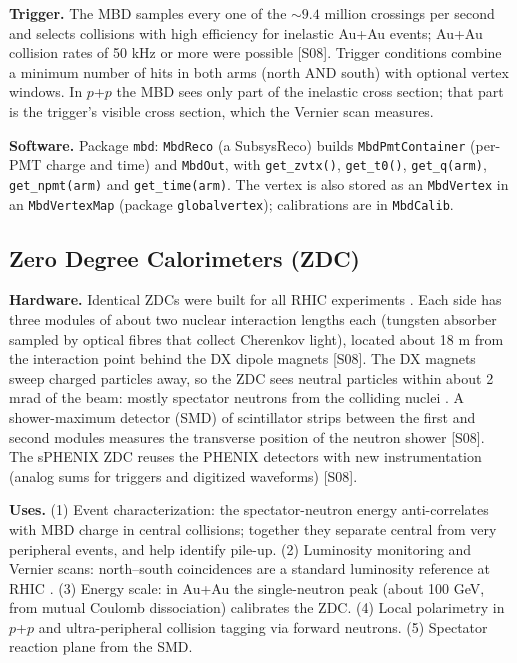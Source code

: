 \documentclass[11pt,letterpaper]{article}
\begin{document}
\textbf{Trigger.} The MBD samples every one of the $\sim9.4$ million crossings per second and selects collisions with high
efficiency for inelastic Au+Au events; Au+Au collision rates of 50 kHz or more were possible [S08]. Trigger conditions
combine a minimum number of hits in both arms (north AND south) with optional vertex windows. In $p$+$p$ the MBD sees only
part of the inelastic cross section; that part is the trigger's visible cross section, which the Vernier scan measures.

\textbf{Software.} Package \texttt{mbd}: \texttt{MbdReco} (a SubsysReco) builds \texttt{MbdPmtContainer} (per-PMT charge and
time) and \texttt{MbdOut}, with \texttt{get\_zvtx()}, \texttt{get\_t0()}, \texttt{get\_q(arm)}, \texttt{get\_npmt(arm)} and
\texttt{get\_time(arm)}. The vertex is also stored as an \texttt{MbdVertex} in an \texttt{MbdVertexMap} (package
\texttt{globalvertex}); calibrations are in \texttt{MbdCalib}.

\subsection{Zero Degree Calorimeters (ZDC)}
\textbf{Hardware.} Identical ZDCs were built for all RHIC experiments \cite{zdc}. Each side has three modules of about two
nuclear interaction lengths each (tungsten absorber sampled by optical fibres that collect Cherenkov light), located about 18 m
from the interaction point behind the DX dipole magnets [S08]. The DX magnets sweep charged particles away, so the ZDC sees
neutral particles within about 2 mrad of the beam: mostly spectator neutrons from the colliding nuclei \cite{zdc}.
A shower-maximum detector (SMD) of scintillator strips between the first and second modules measures the transverse position
of the neutron shower [S08]. The sPHENIX ZDC reuses the PHENIX detectors with new instrumentation (analog sums for triggers and
digitized waveforms) [S08].

\textbf{Uses.} (1) Event characterization: the spectator-neutron energy anti-correlates with MBD charge in central collisions;
together they separate central from very peripheral events, and help identify pile-up. (2) Luminosity monitoring and Vernier
scans: north--south coincidences are a standard luminosity reference at RHIC \cite{zdc}. (3) Energy scale: in Au+Au the
single-neutron peak (about 100 GeV, from mutual Coulomb dissociation) calibrates the ZDC. (4) Local polarimetry in $p$+$p$ and
ultra-peripheral collision tagging via forward neutrons. (5) Spectator reaction plane from the SMD.
\end{document}
